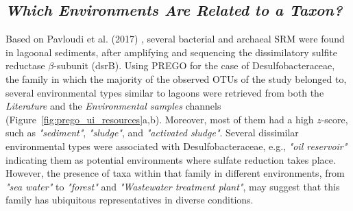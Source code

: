    \subsection*{\textit{Which Environments Are Related to a Taxon?}}
   \label{subsec:envo-taxa}

   Based on Pavloudi et al. (2017) \cite{pavloudi2017diversity}, several bacterial and archaeal SRM were found in lagoonal sediments, after amplifying and sequencing the dissimilatory sulfite reductase $\beta$-subunit (dsrB). 
   Using PREGO for the case of Desulfobacteraceae, the family in which the majority of the observed OTUs of the study belonged to, several environmental types similar to lagoons were retrieved from both the \textit{Literature} and the \textit{Environmental samples} channels (Figure~\ref{fig:prego_ui_resources}a,b). Moreover, most of them had a high $z$-score, such as \textit{"sediment"}, \textit{"sludge"}, and \textit{"activated sludge"}. 
   Several dissimilar environmental types were associated with Desulfobacteraceae, e.g., \textit{"oil reservoir"} indicating them as potential environments where sulfate reduction takes place. 
   However, the presence of taxa within that family in different environments, from \textit{"sea water"} to \textit{"forest"} and \textit{"Wastewater treatment plant"}, may suggest that this family has ubiquitous representatives in diverse conditions.

